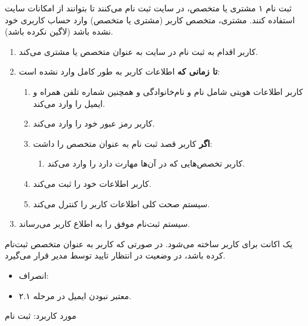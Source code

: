 {
\usecase
{ثبت نام}
{۱}
{مشتری یا متخصص، در سایت ثبت نام می‌کنند تا بتوانند از امکانات سایت استفاده کنند.}
{مشتری، متخصص}
{}{کاربر (مشتری یا متخصص) وارد حساب کاربری خود نشده باشد (لاگین نکرده باشد).}
{
\vspace*{-0.6cm}
\begin{enumerate}
	\item 
	کاربر اقدام به ثبت نام در سایت به عنوان متخصص یا مشتری می‌کند.
	\item
	\textbf{تا زمانی که} اطلاعات کاربر به طور کامل وارد نشده است:
	
	\begin{enumerate}[label=\theenumi.\arabic*.]
	\item
	کاربر اطلاعات هویتی شامل نام و نام‌خانوادگی و همچنین شماره تلفن همراه و ایمیل را وارد می‌کند.
	\item 
	کاربر رمز عبور خود را وارد می‌کند.
	
	\item 
	\textbf{اگر} کاربر قصد ثبت نام به عنوان متخصص را داشت:
	\begin{enumerate}
		\item 
		کاربر تخصص‌هایی که در آن‌ها مهارت دارد را وارد می‌کند.
	\end{enumerate}

	\item 
	کاربر اطلاعات خود را ثبت می‌کند.
	
	\item 
	سیستم صحت کلی اطلاعات کاربر را کنترل می‌کند.
	\end{enumerate}
	
	\item 
	سیستم ثبت‌نام موفق را به اطلاع کاربر می‌رساند.
	
	
\end{enumerate}
}
{یک اکانت برای کاربر ساخته می‌شود. در صورتی که کاربر به عنوان متخصص ثبت‌نام کرده باشد، در وضعیت در انتظار تایید توسط مدیر قرار می‌گیرد.}
{\begin{itemize}
		\vspace*{-0.6cm}
		\item انصراف: 
		\item معتبر نبودن ایمیل در مرحله ۲.۱.
		
		
\end{itemize}}
{مورد کاربرد: ثبت نام}


}
